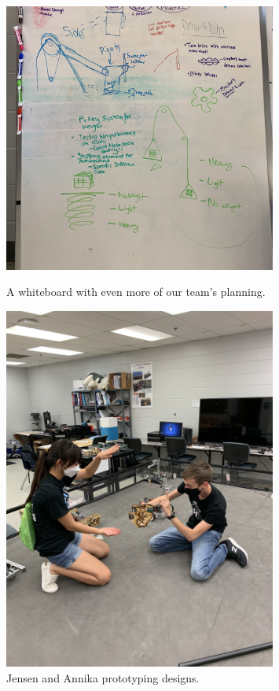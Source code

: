 \begin{figure}[ht]
\centering
\begin{minipage}[b]{.50\textwidth}
  \centering
  \includegraphics[width=0.8\textwidth]{Meetings/September/09-21-21/9-19-21_Team_Image5 - Nathan Forrer.JPG}
  \caption{A whiteboard with even more of our team's planning.}
  \label{fig:pic5}
\end{minipage}%
\hfill%
\begin{minipage}[b]{.50\textwidth}
  \centering
  \includegraphics[width=0.8\textwidth]{Meetings/September/09-21-21/9-19-21_Team_Image6 - Nathan Forrer.JPG}
  \caption{Jensen and Annika prototyping designs.}
  \label{fig:pic6}
\end{minipage}
\end{figure}

